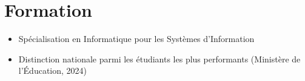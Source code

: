 \section{Formation}


\begin{itemize}[itemsep=1pt, topsep=1pt, leftmargin=15pt]
  \item Spécialisation en Informatique pour les Systèmes d'Information
\end{itemize}

\vspace{4pt}



\begin{itemize}[itemsep=1pt, topsep=1pt, leftmargin=15pt]
  \item Distinction nationale parmi les étudiants les plus performants (Ministère de l'Éducation, 2024)
\end{itemize}